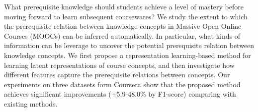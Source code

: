 What prerequisite knowledge should students achieve a level of mastery before moving forward to learn subsequent coursewares? We study the extent to which the prerequisite relation between knowledge concepts in Massive Open Online Courses (MOOCs) can be inferred automatically. In particular, what kinds of information can be leverage to uncover the potential prerequisite relation between knowledge concepts. We first propose a representation learning-based method for learning latent representations of course concepts, and then investigate how different features capture the prerequisite relations between concepts. Our experiments on three datasets form Coursera show that the proposed method achieves significant improvements (+5.9-48.0\% by F1-score) comparing with existing methods.
